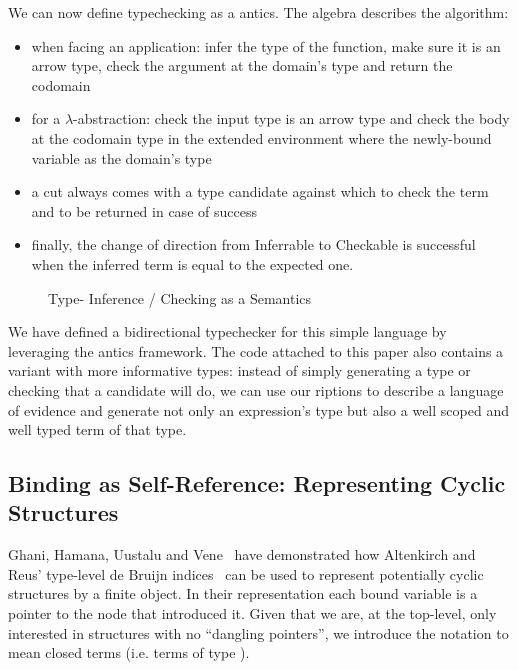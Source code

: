 We can now define typechecking as a antics. The algebra describes the
algorithm:
\begin{itemize}
  \item when facing an application: infer the type of the function, make sure
    it is an arrow type, check the argument at the domain's type and return the
    codomain
  \item for a $\lambda$-abstraction: check the input type is an arrow type and
    check the body at the codomain type in the extended environment where the
    newly-bound variable as the domain's type
  \item a cut always comes with a type candidate against which to check the term
    and to be returned in case of success
  \item finally, the change of direction from Inferrable to Checkable is successful
    when the inferred term is equal to the expected one.
\end{itemize}

\begin{figure}[h]
\caption{Type- Inference / Checking as a Semantics}
\end{figure}

We have defined a bidirectional typechecker for
this simple language by leveraging the antics framework. The code attached
to this paper also contains a variant with more informative types: instead of simply
generating a type or checking that a candidate will do, we can use our riptions
to describe a language of evidence and generate not only an expression's type but
also a well scoped and well typed term of that type.

\subsection{Binding as Self-Reference: Representing Cyclic Structures}\label{def:colist}

Ghani, Hamana, Uustalu and Vene~\citeyear{ghani2006representing} have
demonstrated how Altenkirch and Reus' type-level de Bruijn
indices~\citeyear{altenkirch1999monadic} can be used to represent
potentially cyclic structures by a finite object. In their
representation each bound variable is a pointer to the node
that introduced it. Given that we are, at the top-level, only
interested in structures with no ``dangling pointers'', we introduce
the notation   to mean closed terms (i.e. terms of type
   \AIC{[]}).


